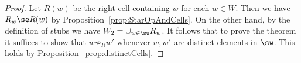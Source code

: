 \begin{proof}
    Let $R(w)$ be the right \kl cell containing $w$ for each $w\in W$. Then we have $R_w\se R(w)$ by
    Proposition~\ref{prop:StarOpAndCells}.  On the other hand, by the definition of stubs we have
    $W_2=\cup_{w\in \sw} R_w$.  It follows that to prove the theorem it suffices to show that
    $w\not\sim_R w'$ whenever $w,w'$ are distinct elements in $\sw$. This holds by
    Proposition~\ref{prop:distinctCells}.
\end{proof}
